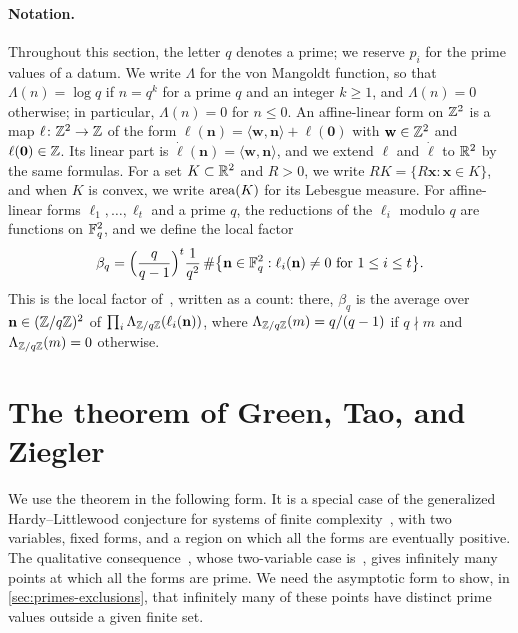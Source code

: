 \paragraph{Notation.} Throughout this section, the letter $q$ denotes a prime; we reserve $p_i$ for the prime values of a datum. We write $\Lambda$ for the von Mangoldt function, so that $\Lambda(n)=\log q$ if $n=q^k$ for a prime $q$ and an integer $k\ge1$, and $\Lambda(n)=0$ otherwise; in particular, $\Lambda(n)=0$ for $n\le0$. An affine-linear form on $\mathbb Z^2$ is a map $\ell\colon\mathbb Z^2\to\mathbb Z$ of the form $\ell(\mathbf n)=\langle\mathbf w,\mathbf n\rangle+\ell(\mathbf 0)$ with $\mathbf w\in\mathbb Z^2$ and $\ell(\mathbf 0)\in\mathbb Z$. Its linear part is $\dot\ell(\mathbf n)=\langle\mathbf w,\mathbf n\rangle$, and we extend $\ell$ and $\dot\ell$ to $\mathbb R^2$ by the same formulas. For a set $K\subset\mathbb R^2$ and $R>0$, we write $RK=\{R\mathbf x:\mathbf x\in K\}$, and when $K$ is convex, we write $\operatorname{area}(K)$ for its Lebesgue measure. For affine-linear forms $\ell_1,\dots,\ell_t$ and a prime $q$, the reductions of the $\ell_i$ modulo $q$ are functions on $\mathbb F_q^2$, and we define the local factor
\begin{equation}\label{eq:local-factor}
\beta_q=\Big(\frac q{q-1}\Big)^t\frac{1}{q^2}\,\#\big\{\mathbf n\in\mathbb F_q^2:\ell_i(\mathbf n)\ne0\text{ for }1\le i\le t\big\}.
\end{equation}
This is the local factor of~\cite[(1.6)]{GT2010}, written as a count: there, $\beta_q$ is the average over $\mathbf n\in(\mathbb Z/q\mathbb Z)^2$ of $\prod_i\Lambda_{\mathbb Z/q\mathbb Z}(\ell_i(\mathbf n))$, where $\Lambda_{\mathbb Z/q\mathbb Z}(m)=q/(q-1)$ if $q\nmid m$ and $\Lambda_{\mathbb Z/q\mathbb Z}(m)=0$ otherwise.

\section{The theorem of Green, Tao, and Ziegler}\label{sec:primes-gtz}

We use the theorem in the following form. It is a special case of the generalized Hardy--Littlewood conjecture for systems of finite complexity~\cite[Conjecture~1.2]{GT2010}, with two variables, fixed forms, and a region on which all the forms are eventually positive. The qualitative consequence~\cite[Corollary~1.9]{GT2010}, whose two-variable case is~\cite[Theorem~1.1]{HSW2014}, gives infinitely many points at which all the forms are prime. We need the asymptotic form to show, in \cref{sec:primes-exclusions}, that infinitely many of these points have distinct prime values outside a given finite set.

